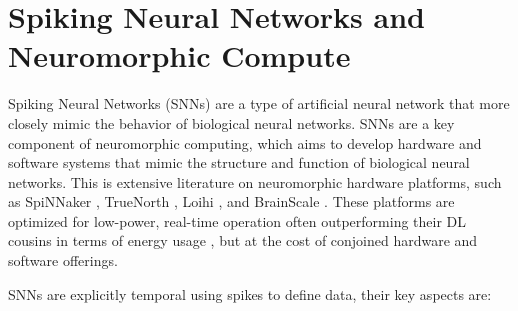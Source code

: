 \documentclass{article}
\begin{document}
\section{Spiking Neural Networks and Neuromorphic Compute}\label{neuro}

Spiking Neural Networks (SNNs) \cite{maass2001pulsed} are a type of artificial neural network that more closely mimic the behavior of biological neural networks. SNNs are a key component of neuromorphic computing, which aims to develop hardware and software systems that mimic the structure and function of biological neural networks. This is extensive literature on neuromorphic hardware platforms, such as SpiNNaker \cite{furber2016large,furber2014spinnaker}, TrueNorth \cite{sawada2016truenorth}, Loihi \cite{davies2018loihi}, and BrainScale \cite{schmitt2017neuromorphic}. These platforms are optimized for low-power, real-time operation often outperforming their DL cousins in terms of energy usage \cite{reuther20}, but at the cost of conjoined hardware and software offerings.

SNNs are explicitly temporal using spikes to define data, their key aspects are:
\end{document}
